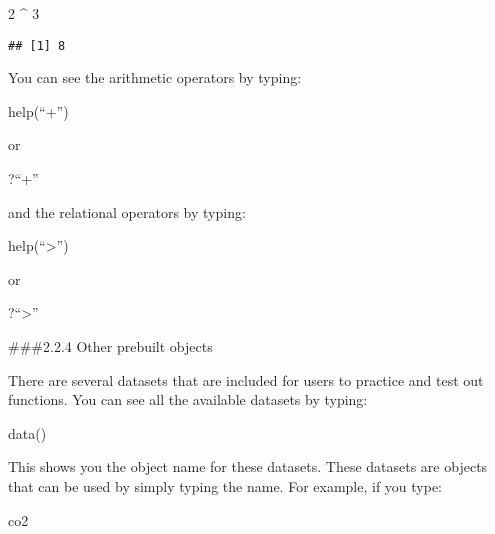 \documentclass[
]{article}
\newenvironment{Shaded}{\begin{snugshade}}{\end{snugshade}}
\newcommand{\DecValTok}[1]{\textcolor[rgb]{0.00,0.00,0.81}{#1}}
\newcommand{\FunctionTok}[1]{\textcolor[rgb]{0.00,0.00,0.00}{#1}}
\newcommand{\NormalTok}[1]{#1}
\newcommand{\SpecialCharTok}[1]{\textcolor[rgb]{0.00,0.00,0.00}{#1}}
\begin{document}
\begin{Shaded}
\begin{Highlighting}[]
\DecValTok{2} \SpecialCharTok{\^{}} \DecValTok{3}
\end{Highlighting}
\end{Shaded}

\begin{verbatim}
## [1] 8
\end{verbatim}

You can see the arithmetic operators by typing:

help(``+'')

or

?``+''

and the relational operators by typing:

help(``\textgreater{}'')

or

?``\textgreater{}''

\#\#\#2.2.4 Other prebuilt objects

There are several datasets that are included for users to practice and
test out functions. You can see all the available datasets by typing:

\begin{Shaded}
\begin{Highlighting}[]
\FunctionTok{data}\NormalTok{()}
\end{Highlighting}
\end{Shaded}

This shows you the object name for these datasets. These datasets are
objects that can be used by simply typing the name. For example, if you
type:

\begin{Shaded}
\begin{Highlighting}[]
\NormalTok{co2}
\end{Highlighting}
\end{Shaded}
\end{document}
